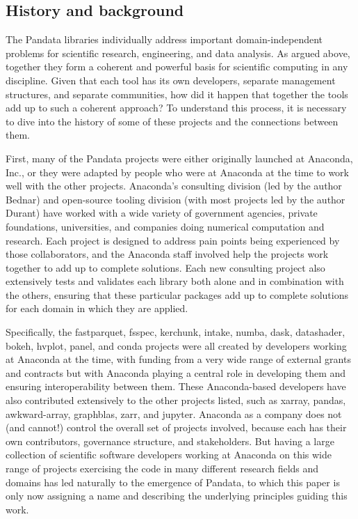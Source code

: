 \subsection{History and background}

The Pandata libraries individually address important domain-independent problems for scientific research, engineering, and data analysis. As argued above, together they form a coherent and powerful basis for scientific computing in any discipline. Given that each tool has its own developers, separate management structures, and separate communities, how did it happen that together the tools add up to such a coherent approach? To understand this process, it is necessary to dive into the history of some of these projects and the connections between them.

First, many of the Pandata projects were either originally launched at Anaconda, Inc., or they were adapted by people who were at Anaconda at the time to work well with the other projects. Anaconda's consulting division (led by the author Bednar) and open-source tooling division (with most projects led by the author Durant) have worked with a wide variety of government agencies, private foundations, universities, and companies doing numerical computation and research. Each project is designed to address pain points being experienced by those collaborators, and the Anaconda staff involved help the projects work together to add up to complete solutions. Each new consulting project also extensively tests and validates each library both alone and in combination with the others, ensuring that these particular packages add up to complete solutions for each domain in which they are applied.

Specifically, the fastparquet, fsspec, kerchunk, intake, numba, dask, datashader, bokeh, hvplot, panel, and conda projects were all created by developers working at Anaconda at the time, with funding from a very wide range of external grants and contracts but with Anaconda playing a central role in developing them and ensuring interoperability between them. These Anaconda-based developers have also contributed extensively to the other projects listed, such as xarray, pandas, awkward-array, graphblas, zarr, and jupyter. Anaconda as a company does not (and cannot!) control the overall set of projects involved, because each has their own contributors, governance structure, and stakeholders. But having a large collection of scientific software developers working at Anaconda on this wide range of projects exercising the code in many different research fields and domains has led naturally to the emergence of Pandata, to which this paper is only now assigning a name and describing the underlying principles guiding this work.

